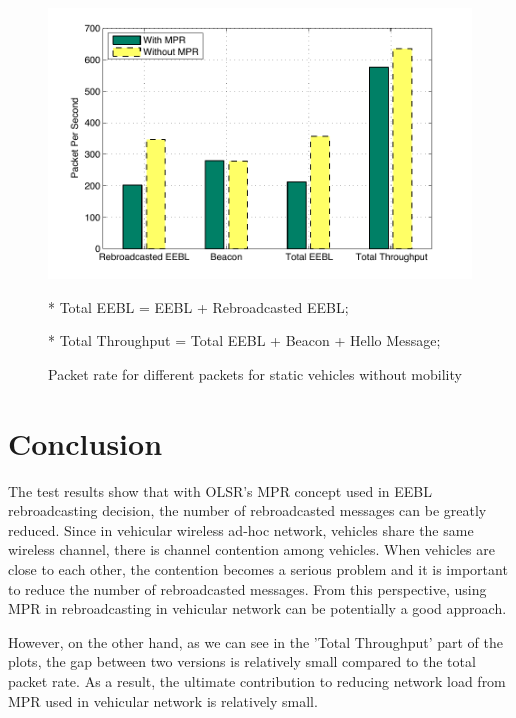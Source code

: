 \documentclass[twocolumn]{article}
\begin{document}
    \begin{figure}[htb]
    \begin{center}
    \includegraphics[width=\columnwidth]{fig/static.pdf}
    \end{center}
    \par{\footnotesize{* Total EEBL = EEBL + Rebroadcasted EEBL;}}
    \par{\footnotesize{* Total Throughput = Total EEBL + Beacon + Hello Message;}}
    \caption{Packet rate for different packets for static vehicles without mobility}
    \label{fig:static}
    \end{figure}

    \section{Conclusion}
    \par{The test results show that with OLSR's MPR concept used in EEBL rebroadcasting decision, the number of rebroadcasted messages can be greatly reduced. Since in vehicular wireless ad-hoc network, vehicles share the same wireless channel, there is channel contention among vehicles. When vehicles are close to each other, the contention becomes a serious problem and it is important to reduce the number of rebroadcasted messages. From this perspective, using MPR in rebroadcasting in vehicular network can be potentially a good approach.}
    \par{However, on the other hand, as we can see in the 'Total Throughput' part of the plots, the gap between two versions is relatively small compared to the total packet rate. As a result, the ultimate contribution to reducing network load from MPR used in vehicular network is relatively small.}
\end{document}

